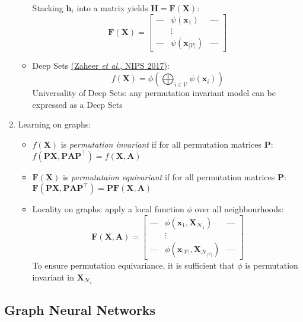 \documentclass{article}
\begin{document}
\begin{enumerate}
\begin{itemize}[topsep=0pt]
		Stacking $\mathbf{h}_i$ into a matrix yields $\mathbf{H}=\bm{F}(\mathbf{X})$:
		$$\bm{F}(\mathbf{X})=\begin{bmatrix}
			\text{---} & \!\!\!\psi(\mathbf{x}_1) & \!\!\!\text{{--}{--}} \\ 
			{} & \vdots & {} \\
			\text{{--}{--}} & \!\!\!\psi(\mathbf{x}_{|\mathcal{V}|}) & \!\!\!\text{{--}{--}}
		\end{bmatrix}$$
		\item Deep Sets \href{https://papers.nips.cc/paper/2017/file/f22e4747da1aa27e363d86d40ff442fe-Paper.pdf}{(Zaheer \textit{et al.}, NIPS 2017)}: 
		$$f(\mathbf{X})=\phi\left(\bigoplus_{i\in\mathcal{V}}\psi(\mathbf{x}_i)\right)$$
		Universality of Deep Sets: any permutation invariant model can be expressed as a Deep Sets
	\end{itemize}

	\item Learning on graphs:
	\begin{itemize}[topsep=0pt]
		\item $f(\mathbf{X})$ is \textit{permutation invariant} if for all permutation matrices $\mathbf{P}$: $f(\mathbf{PX},\mathbf{PA}\mathbf{P}^\top)=f(\mathbf{X},\mathbf{A})$
		\item $\bm{F}(\mathbf{X})$ is \textit{permutataion equivariant} if for all permutation matrices $\mathbf{P}$: $\bm{F}(\mathbf{PX},\mathbf{PA}\mathbf{P}^\top)=\mathbf{P}\bm{F}(\mathbf{X},\mathbf{A})$ 
		\item Locality on graphs: apply a local function $\phi$ over all neighbourhoods:
		$$\bm{F}(\mathbf{X},\mathbf{A})=\begin{bmatrix}
			\text{---} & \!\!\!\phi(\mathbf{x}_1,\mathbf{X}_{\mathcal{N}_1}) & \!\!\!\text{{--}{--}} \\ 
			{} & \vdots & {} \\
			\text{{--}{--}} & \!\!\!\phi(\mathbf{x}_{|\mathcal{V}|},\mathbf{X}_{\mathcal{N}_{|\mathcal{V}|}}) & \!\!\!\text{{--}{--}}
		\end{bmatrix}$$
		To ensure permutation equivariance, it is sufficient that $\phi$ is permutation invariant in $\mathbf{X}_{\mathcal{N}_i}$
	\end{itemize}
\end{enumerate}

\subsection{Graph Neural Networks}
\end{document}

